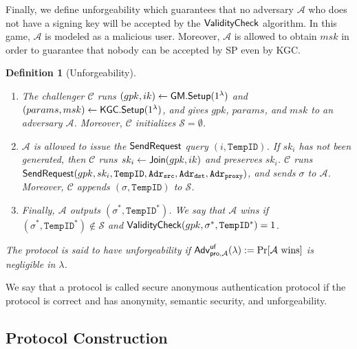 \documentclass[preprint]{sig-alternate}
\newtheorem{definition}{Definition}[section]
\begin{document}
\noindent 
Finally, we define unforgeability which guarantees that no adversary $\mathcal{A}$ who does not have a signing key will be accepted by the ${\sf ValidityCheck}$ algorithm. In this game, $\mathcal{A}$ is modeled as a malicious user. Moreover, $\mathcal{A}$ is allowed to obtain $msk$ in order to guarantee that nobody can be accepted by SP even by KGC. 

\begin{definition}[Unforgeability]~
\begin{enumerate}
\setlength{\itemsep}{0em}\setlength{\parsep}{0em}
\item The challenger $\mathcal{C}$ runs $(gpk,ik)\leftarrow{\sf GM.Setup}(1^\lambda)$ and $(params,msk)\leftarrow {\sf KGC.Setup}(1^\lambda)$, and gives $gpk$, $params$, and $msk$ to an adversary $\mathcal{A}$. 
Moreover, $\mathcal{C}$ initializes $\mathcal{S}=\emptyset$. 

\item $\mathcal{A}$ is allowed to issue the ${\sf SendRequest}$ query $(i,\mathtt{TempID})$. If $sk_i$ has not been generated, then $\mathcal{C}$ runs $sk_i\leftarrow {\sf Join}(gpk,ik)$ and preserves $sk_i$. 
$\mathcal{C}$ runs ${\sf SendRequest}(gpk,\allowbreak sk_i,\allowbreak \mathtt{TempID},\allowbreak \mathtt{Adr_{src}},\allowbreak \mathtt{Adr_{dst}},\allowbreak \mathtt{Adr_{proxy}})$, and sends $\sigma$ to $\mathcal{A}$. 
Moreover, $\mathcal{C}$ appends $(\sigma,\mathtt{TempID})$ to $\mathcal{S}$. 

\item Finally, $\mathcal{A}$ outputs $(\sigma^\ast, \mathtt{TempID}^\ast)$. We say that $\mathcal{A}$ wins if $(\sigma^\ast, \mathtt{TempID}^\ast)\not\in\mathcal{S}$ and ${\sf ValidityCheck}(gpk,\sigma^\ast,\allowbreak \mathtt{TempID}^\ast)\allowbreak=1$. 
\end{enumerate}

\noindent 
The protocol is said to have unforgeability if ${\sf Adv}^{{\sf uf}}_{{\sf pro},\mathcal{A}}(\lambda):=\Pr[\mathcal{A}~\text{wins}]$ is negligible in $\lambda$. 
\end{definition}

\noindent 
We say that a protocol is called secure anonymous authentication protocol if the protocol is correct and has anonymity, semantic security, and unforgeability. 



\subsection{Protocol Construction}\label{Sec:ProtocolConstruction}
\end{document}
